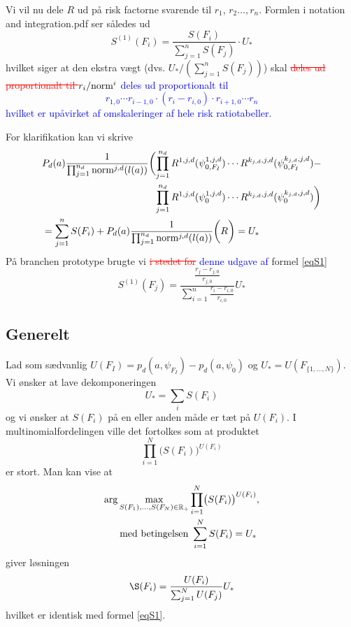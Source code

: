 \documentclass[a4paper, 12pt]{memoir}
\begin{document}
Vi vil nu dele $R$ ud på risk factorne svarende til $r_1$, $r_2 \dots , r_n$. Formlen i notation and integration.pdf ser således ud
\begin{equation}
S^{(1)}(F_i)=\frac{S(F_i)}{\sum_{j=1}^{n}S(F_j)}\cdot U_* \label{eqS1}
\end{equation}
hvilket siger at den ekstra vægt (dvs. $U_{*}/(\sum_{j=1}^{n}S(F_j))$) skal \textcolor{red}{\sout{deles ud proportionalt til $r_i/\textup{norm}^{i}$}} \textcolor{blue}{deles ud proportionalt til 
\begin{equation}
r_{1,0}\cdots r_{i-1,0}\cdot (r_i-r_{i,0}) \cdot r_{i+1,0}\cdots r_n
\end{equation}
hvilket er upåvirket af omskaleringer af hele risk ratiotabeller.
}

For klarifikation kan vi skrive
\begin{align}
 &P_d(a) \frac{1}{\prod_{j=1}^{n_d}{\textup{norm}^{j,d}(l(a))}}\biggl(\begin{lgathered}[t]\prod_{j=1}^{n_d} {R^{1,j,d}(\psi_{0,F_I}^{1,j,d})  \cdots R^{k_{j,d},j,d}(\psi_{0,F_I}^{k_{j,d},j,d}) }-\\
 \prod_{j=1}^{n_d} {R^{1,j,d}(\psi_{0}^{1,j,d}) \cdots R^{k_{j,d},j,d}(\psi_{0}^{k_{j,d},j,d}) }\biggr)\end{lgathered}\\
 &=\sum_{j=1}^{n}S(F_i)+P_d(a) \frac{1}{\prod_{j=1}^{n_d}{\textup{norm}^{j,d}(l(a))}}\biggl(R\biggr)=U_{*}
\end{align}
På branchen prototype brugte vi \textcolor{red}{\sout{i stedet for}} \textcolor{blue}{denne udgave af} formel \eqref{eqS1}
\begin{equation}
S^{(1)}(F_j)=\frac{\frac{r_j-r_{j,0}}{r_{j,0}}}{\sum_{i=1}^n\frac{r_i-r_{i,0}}{r_{i,0}}} U_{*}
\end{equation}

\subsection{Generelt}
Lad som sædvanlig $U(F_I)=p_d(a,\psi_{F_I})-p_d(a, \psi_{0})$ og $U_*=U(F_{\{1,\dots,N\}})$. Vi ønsker at lave dekomponeringen 
\begin{equation}
U_*=\sum_{i}S(F_i)
\end{equation}
og vi ønsker at $S(F_i)$ på en eller anden måde er tæt på $U(F_i)$. I multinomialfordelingen ville det fortolkes som at produktet
\begin{equation}
\prod_{i=1}^{N}\bigl(S(F_i)\bigr)^{U(F_i)}
\end{equation}
er stort. Man kan vise at 
\begin{gather}
\textup{arg}\max_{S(F_1), \dots, S(F_N) \in \mathbb R_+} \prod_{i=1}^{N}\bigl(S(F_i)\bigr)^{U(F_i)}, 	\\\quad \textup{ med betingelsen } \sum_{i=1}^NS(F_i)=U_*
\end{gather}
giver løsningen 
\begin{equation}
\S(F_i)=\frac{U(F_i)}{\sum_{j=1}^N U(F_j)}U_*
\end{equation}
hvilket er identisk med formel \eqref{eqS1}. 
\end{document}
